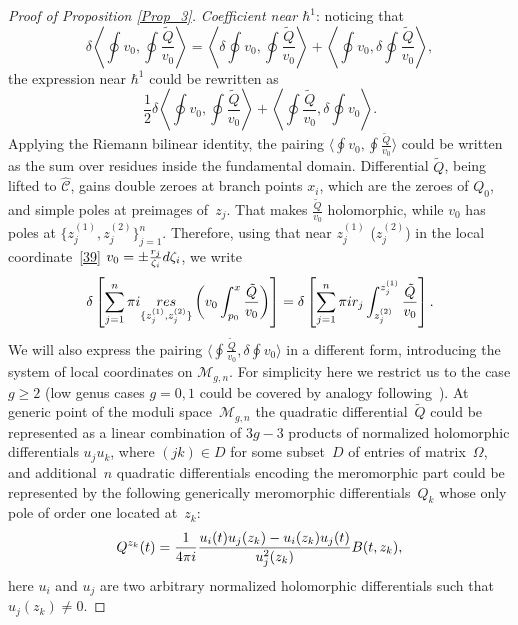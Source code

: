 \documentclass[10pt,a4paper]{article}
\numberwithin{equation}{section}
\theoremstyle{definition}
\begin{document}
\begin{proof}[Proof of Proposition \ref{Prop_3}]
\textit{Coefficient near $\hbar^1$}: noticing that
\begin{equation*}%
\delta\left\langle \oint v_0, \oint \frac{\tilde{Q}}{v_0}\right\rangle =\left\langle \delta \oint v_0, \oint \frac{\tilde{Q}}{v_0}\right\rangle +\left\langle \oint v_0, \delta \oint \frac{\tilde{Q}}{v_0}\right\rangle,
\end{equation*}
the expression near $\hbar^1$ could be rewritten as
\begin{equation*}%
\frac{1}{2}\delta\left\langle \oint v_0, \oint \frac{\tilde{Q}}{v_0}\right\rangle +\left\langle \oint \frac{\tilde{Q}}{v_0}, \delta \oint v_0\right\rangle .
\end{equation*}
 Applying the Riemann bilinear identity, the pairing $\big\langle \oint v_0, \oint \frac{\tilde{Q}}{v_0}\big\rangle $ could be written as the sum over residues inside the fundamental domain. Differential $\tilde{Q}$, being lifted to $\hat{\mathcal{C}}$, gains double zeroes at branch points $x_i$, which are the zeroes of $Q_0$, and simple poles at preimages of~$z_j$. That makes $\frac{\tilde{Q}}{v_0}$ holomorphic, while $v_0$ has poles at
$\big\{z^{(1)}_j, z^{(2)}_j \big\}^n_{j=1}$. Therefore, using that near $z^{(1)}_j$ \big($z^{(2)}_j$\big) in the local coordinate~\eqref{39} $v_0=\pm \frac{r_j}{\zeta_i}{\rm d}\zeta_i$, we write
\begin{equation}\label{109}\delta
\left[\sum^n_{j=1}\pi {\rm i} \underset{\{z^{(1)}_j, z^{(2)}_j \}}{\rm res}\left(v_0
\int^x_{p_0}\frac{\tilde{Q}}{v_0} \right)\right]=\delta\left[\sum^n_{j=1}\pi{\rm i} r_j
\int^{z^{(1)}_j}_{z^{(2)}_j}\frac{\tilde{Q}}{v_0} \right]. \end{equation}
We will also express the pairing $\big\langle \oint \frac{\tilde{Q}}{v_0}, \delta \oint v_0\big\rangle $ in a different form, introducing the system of local coordinates on $\mathcal{M}_{g,n}$. For simplicity here we restrict us to the case $g \geq 2$ (low genus cases $g=0,1$ could be covered by analogy following~\cite{korotkin2018periods}). At generic point of the moduli space~$\mathcal{M}_{g,n}$ the quadratic differential~$\tilde{Q}$ could be represented as a linear combination of $3g-3$ products of normalized holomorphic differentials $u_j u_k$, where $(jk) \in D$ for some subset~$D$ of entries of matrix~$\Omega$, and additional~$n$ quadratic differentials encoding the meromorphic part could be represented by the following generically meromorphic differentials~$Q_k$ whose only pole of order one located at~$z_k$:
\begin{equation}\label{110}
Q^{z_k}(t)=\frac{1}{4 \pi {\rm i}}\frac{u_i(t)u_j(z_k)-u_i(z_k)u_j(t)}{u_j^2(z_k)}B(t, z_k),
\end{equation}
here $u_i$ and $u_j$ are two arbitrary normalized holomorphic differentials such that $u_j(z_k) \neq 0$.


\end{proof}
\end{document}
